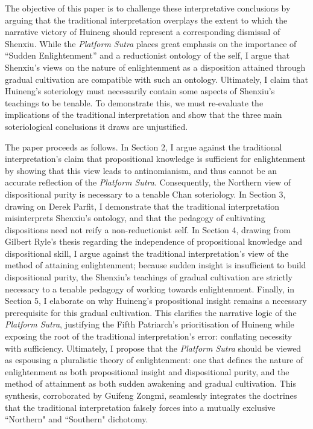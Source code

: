 The objective of this paper is to challenge these interpretative
conclusions by arguing that the traditional interpretation overplays the
extent to which the narrative victory of Huineng should represent a
corresponding dismissal of Shenxiu. While the \emph{Platform Sutra}
places great emphasis on the importance of ``Sudden Enlightenment'' and
a reductionist ontology of the self, I argue that Shenxiu's views on the
nature of enlightenment as a disposition attained through gradual
cultivation are compatible with such an ontology. Ultimately, I claim
that Huineng's soteriology must necessarily contain some aspects of
Shenxiu's teachings to be tenable. To demonstrate this, we must
re-evaluate the implications of the traditional interpretation and show
that the three main soteriological conclusions it draws are unjustified.

The paper proceeds as follows. In Section 2, I argue against the
traditional interpretation's claim that propositional knowledge is
sufficient for enlightenment by showing that this view leads to
antinomianism, and thus cannot be an accurate reflection of the
\emph{Platform Sutra}. Consequently, the Northern view of dispositional
purity is necessary to a tenable Chan soteriology. In Section 3, drawing
on Derek Parfit, I demonstrate that the traditional interpretation
misinterprets Shenxiu's ontology, and that the pedagogy of cultivating
dispositions need not reify a non-reductionist self. In Section 4,
drawing from Gilbert Ryle's thesis regarding the independence of
propositional knowledge and dispositional skill, I argue against the
traditional interpretation's view of the method of attaining
enlightenment; because sudden insight is insufficient to build
dispositional purity, the Shenxiu's teachings of gradual cultivation are
strictly necessary to a tenable pedagogy of working towards
enlightenment. Finally, in Section 5, I elaborate on why Huineng's
propositional insight remains a necessary prerequisite for this gradual
cultivation. This clarifies the narrative logic of the \emph{Platform
Sutra}, justifying the Fifth Patriarch's prioritisation of Huineng while
exposing the root of the traditional interpretation's error: conflating
necessity with sufficiency. Ultimately, I propose that the
\emph{Platform Sutra} should be viewed as espousing a pluralistic theory
of enlightenment: one that defines the nature of enlightenment as both
propositional insight and dispositional purity, and the method of
attainment as both sudden awakening and gradual cultivation. This
synthesis, corroborated by Guifeng Zongmi, seamlessly integrates the
doctrines that the traditional interpretation falsely forces into a
mutually exclusive ``Northern" and ``Southern" dichotomy.

